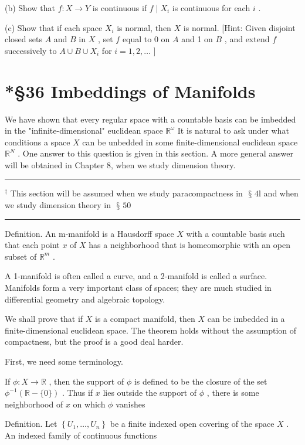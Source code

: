 \documentclass[10pt]{article}
\newcommand{\HRule}{\begin{center}\rule{0.9\linewidth}{0.2mm}\end{center}}
\begin{document}
(b) Show that \(f : X \rightarrow  Y\) is continuous if \(f \mid  {X}_{i}\) is continuous for each \(i\) .

(c) Show that if each space \({X}_{i}\) is normal, then \(X\) is normal. [Hint: Given disjoint closed sets \(A\) and \(B\) in \(X\) , set \(f\) equal to 0 on \(A\) and 1 on \(B\) , and extend \(f\) successively to \(A \cup  B \cup  {X}_{i}\) for \(i = 1,2,\ldots\) ]

\section*{*§36 Imbeddings of Manifolds}

We have shown that every regular space with a countable basis can be imbedded in the "infinite-dimensional" euclidean space \({\mathbb{R}}^{\omega }\) It is natural to ask under what conditions a space \(X\) can be unbedded in some finite-dimensional euclidean space \({\mathbb{R}}^{N}\) . One answer to this question is given in this section. A more general answer will be obtained in Chapter 8, when we study dimension theory.

\HRule

\({}^{ \dagger  }\) This section will be assumed when we study paracompactness in \(\text{ § }4\mathrm{l}\) and when we study dimension theory in \(\text{ § }{50}\)

\HRule

Definition. An m-manifold is a Hausdorff space \(X\) with a countable basis such that each point \(x\) of \(X\) has a neighborhood that is homeomorphic with an open subset of \({\mathbb{R}}^{m}\) .

A 1-manifold is often called a curve, and a 2-manifold is called a surface. Manifolds form a very important class of spaces; they are much studied in differential geometry and algebraic topology.

We shall prove that if \(X\) is a compact manifold, then \(X\) can be imbedded in a finite-dimensional euclidean space. The theorem holds without the assumption of compactness, but the proof is a good deal harder.

First, we need some terminology.

If \(\phi  : X \rightarrow  \mathbb{R}\) , then the support of \(\phi\) is defined to be the closure of the set \({\phi }^{-1}\left( {\mathbb{R}-\{ 0\} }\right)\) . Thus if \(x\) lies outside the support of \(\phi\) , there is some neighborhood of \(x\) on which \(\phi\) vanishes

Definition. Let \(\left\{  {{U}_{1},\ldots ,{U}_{n}}\right\}\) be a finite indexed open covering of the space \(X\) . An indexed family of continuous functions
\end{document}
